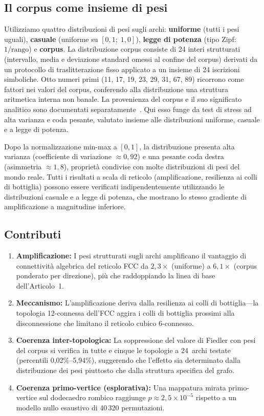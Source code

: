 \documentclass[11pt]{article}
\begin{document}
\subsection{Il corpus come insieme di pesi}
\label{sec:corpus}

Utilizziamo quattro distribuzioni di pesi sugli archi: \textbf{uniforme}
(tutti i pesi uguali), \textbf{casuale} (uniforme su $[0{,}1;\; 1{,}0]$),
\textbf{legge di potenza} (tipo Zipf: $1/\text{rango}$) e
\textbf{corpus}. La distribuzione corpus consiste di 24 interi
strutturati (intervallo, media e deviazione standard omessi al confine
del corpus) derivati da un protocollo di traslitterazione fisso applicato a
un insieme di 24 iscrizioni simboliche. Otto numeri primi
(11, 17, 19, 23, 29, 31, 67, 89) ricorrono come fattori nei valori
del corpus, conferendo alla distribuzione una struttura aritmetica
interna non banale. La provenienza del corpus e il suo significato
analitico sono documentati
separatamente~\cite{bielec2026shape}. Qui esso funge da test di stress
ad alta varianza e coda pesante, valutato insieme alle distribuzioni
uniforme, casuale e a legge di potenza.

Dopo la normalizzazione min-max a $[0,1]$, la distribuzione presenta
alta varianza (coefficiente di variazione $\approx 0{,}92$) e una
pesante coda destra (asimmetria $\approx 1{,}8$), propriet\`a condivise
con molte distribuzioni di pesi del mondo reale. Tutti i risultati a
scala di reticolo (amplificazione, resilienza ai colli di bottiglia)
possono essere verificati indipendentemente utilizzando le distribuzioni
casuale e a legge di potenza, che mostrano lo stesso gradiente di
amplificazione a magnitudine inferiore.

\subsection{Contributi}

\begin{enumerate}
  \item \textbf{Amplificazione:} I pesi strutturati sugli archi
    amplificano il vantaggio di connettivit\`a algebrica del reticolo
    FCC da $2{,}3\times$ (uniforme) a $6{,}1\times$ (corpus ponderato
    per direzione), pi\`u che raddoppiando la linea di base
    dell'Articolo~1.
  \item \textbf{Meccanismo:} L'amplificazione deriva dalla resilienza
    ai colli di bottiglia---la topologia 12-connessa dell'FCC aggira i
    colli di bottiglia prossimi alla disconnessione che limitano il
    reticolo cubico 6-connesso.
  \item \textbf{Coerenza inter-topologica:} La soppressione del valore
    di Fiedler con pesi del corpus si verifica in tutte e cinque le
    topologie a 24~archi testate (percentili 0,02\%--5,94\%),
    suggerendo che l'effetto sia determinato dalla distribuzione dei
    pesi piuttosto che dalla struttura specifica del grafo.
  \item \textbf{Coerenza primo-vertice (esplorativa):} Una mappatura
    mirata primo-vertice sul dodecaedro rombico raggiunge
    $p \approx 2{,}5 \times 10^{-5}$ rispetto a un modello nullo
    esaustivo di 40\,320 permutazioni.
\end{enumerate}
\end{document}
